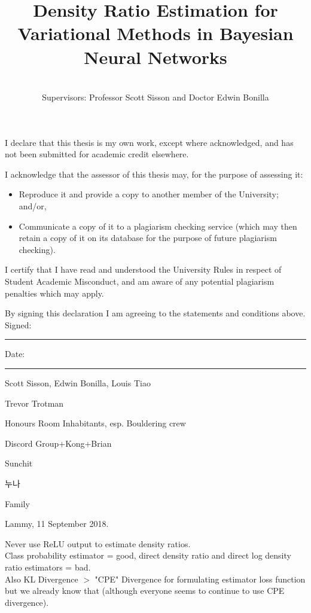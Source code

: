 \documentclass[honours,12pt]{unswthesis}
\title{Density Ratio Estimation for Variational Methods in Bayesian Neural Networks}
\author{\Authornameonly\\{\bigskip}Supervisors: Professor Scott Sisson and Doctor Edwin Bonilla}
\newcommand\blankpage{%
    \null
    \thispagestyle{empty}%
    \addtocounter{page}{-1}%
    \newpage}
\numberwithin{equation}{section}
\theoremstyle{definition}
\begin{document}
\beforepreface

\afterpage{\blankpage}



\vskip 10pc \noindent I declare that this thesis is my
own work, except where acknowledged, and has not been submitted for
academic credit elsewhere. 

\vskip 2pc  \noindent I acknowledge that the assessor of this
thesis may, for the purpose of assessing it:
\begin{itemize}
\item Reproduce it and provide a copy to another member of the University; and/or,
\item Communicate a copy of it to a plagiarism checking service (which may then retain a copy of it on its database for the purpose of future plagiarism checking).
\end{itemize}

\vskip 2pc \noindent I certify that I have read and understood the University Rules in
respect of Student Academic Misconduct, and am aware of any potential plagiarism penalties which may 
apply.\vspace{24pt}

\vskip 2pc \noindent By signing 
this declaration I am
agreeing to the statements and conditions above.
\vskip 2pc \noindent
Signed: \rule{7cm}{0.25pt} \hfill Date: \rule{4cm}{0.25pt} \newline
\vskip 1pc

\afterpage{\blankpage}




{\bigskip}Scott Sisson, Edwin Bonilla, Louis Tiao

{\bigskip\noindent}Trevor Trotman

{\bigskip\noindent}Honours Room Inhabitants, esp. Bouldering crew

{\bigskip\noindent}Discord Group+Kong+Brian

{\bigskip\noindent}Sunchit

{\bigskip\noindent}누나

{\bigskip\noindent}Family

{\bigskip\bigskip\bigskip\noindent} Lammy, 11 September 2018.

\afterpage{\blankpage}


Never use ReLU output to estimate density ratios.\\
Class probability estimator = good, direct density ratio and direct log density ratio estimators = bad.\\ 
Also KL Divergence $>$ "CPE" Divergence for formulating estimator loss function but we already know that (although everyone seems to continue to use CPE divergence).
\afterpage{\blankpage}
\end{document}

